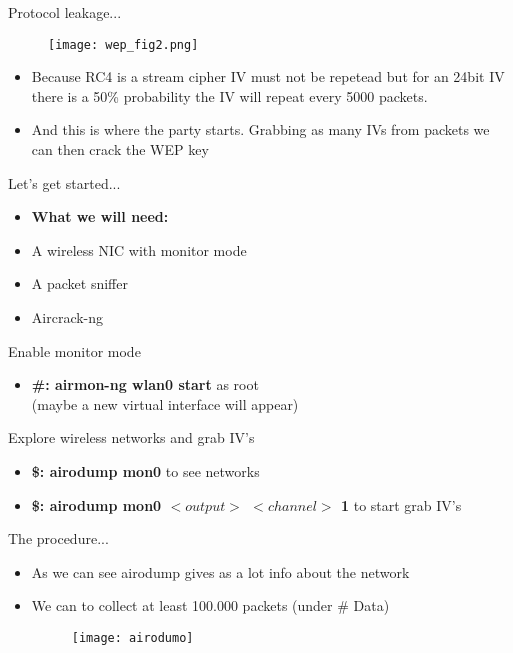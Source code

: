 \documentclass{beamer}
\begin{document}
\begin{frame}{Protocol leakage...}
 \begin{figure}
  \texttt{[image: wep\_fig2.png]}
\end{figure}
\begin{itemize}
  \item Because RC4 is a stream cipher IV must not be repetead but for an 24bit IV there is a 50\% probability
  the IV will repeat every 5000 packets.
  \item And this is where the party starts. Grabbing as many IVs from packets we can then crack the WEP key
\end{itemize}

\end{frame}

\begin{frame}{Let's get started...}
\begin{itemize}
 \item \textbf{What we will need:}
\pause \item A wireless NIC with monitor mode
\pause \item A packet sniffer
\pause \item Aircrack-ng
\end{itemize}
\end{frame}

\begin{frame}{Enable monitor mode}
 \begin{itemize}
\pause  \item \textbf{\#: airmon-ng wlan0 start}\hspace{10pt} as root\\(maybe a new virtual interface will appear)
 \end{itemize}
\end{frame}

\begin{frame}{Explore wireless networks and grab IV's}
 \begin{itemize}
\pause  \item \textbf{\$: airodump mon0 }\hspace{10pt}\hspace{10pt} to see networks 
\pause  \item \textbf{\$: airodump mon0 $<output>$  $<channel> $ 1}\hspace{10pt} to start grab IV's
 \end{itemize}
\end{frame}

\begin{frame}{The procedure...}
 \begin{itemize}
\item As we can see airodump gives as a lot info about the network
\item We can to collect at least 100.000 packets (under \# Data) 
\begin{figure}
 \texttt{[image: airodumo]}
\end{figure}
 \end{itemize}
\end{frame}
\end{document}
